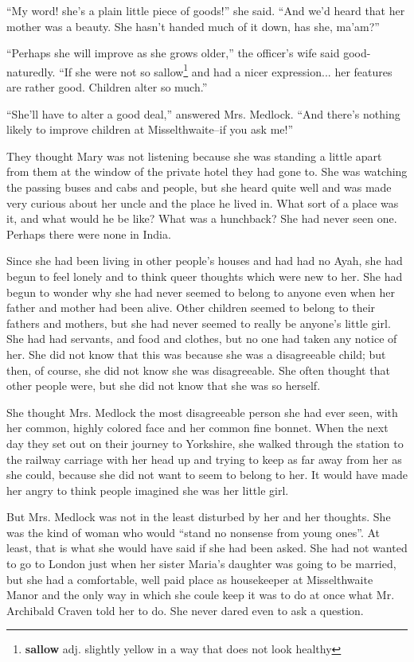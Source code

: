 ``My word! she's a plain little piece of goods!'' she said. ``And we'd heard that her mother was a beauty. She hasn't handed much of it down, has she, ma'am?''

``Perhaps she will improve as she grows older,'' the officer's wife said good-naturedly. ``If she were not so sallow\footnote{\textbf{sallow} adj. slightly yellow in a way that does not look healthy} and had a nicer expression... her features are rather good. Children alter so much.''

``She'll have to alter a good deal,'' answered Mrs. Medlock. ``And there's nothing likely to improve children at Misselthwaite--if you ask me!''

They thought Mary was not listening because she was standing a little apart from them at the window of the private hotel they had gone to. She was watching the passing buses and cabs and people, but she heard quite well and was made very curious about her uncle and the place he lived in. What sort of a place was it, and what would he be like? What was a hunchback? She had never seen one. Perhaps there were none in India.

Since she had been living in other people's houses and had had no Ayah, she had begun to feel lonely and to think queer thoughts which were new to her. She had begun to wonder why she had never seemed to belong to anyone even when her father and mother had been alive. Other children seemed to belong to their fathers and mothers, but she had never seemed to really be anyone's little girl. She had had servants, and food and clothes, but no one had taken any notice of her. She did not know that this was because she was a disagreeable child; but then, of course, she did not know she was disagreeable. She often thought that other people were, but she did not know that she was so herself.

She thought Mrs. Medlock the most disagreeable person she had ever seen, with her common, highly colored face and her common fine bonnet. When the next day they set out on their journey to Yorkshire, she walked through the station to the railway carriage with her head up and trying to keep as far away from her as she could, because she did not want to seem to belong to her. It would have made her angry to think people imagined she was her little girl.

But Mrs. Medlock was not in the least disturbed by her and her thoughts. She was the kind of woman who would ``stand no nonsense from young ones''. At least, that is what she would have said if she had been asked. She had not wanted to go to London just when her sister Maria's daughter was going to be married, but she had a comfortable, well paid place as housekeeper at Misselthwaite Manor and the only way in which she coule keep it was to do at once what Mr. Archibald Craven told her to do. She never dared even to ask a question.


